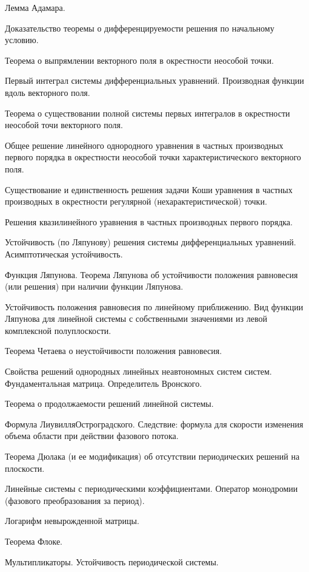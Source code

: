 \documentclass[a4paper]{article}
\begin{document}
\begin{nums}{-2}
Лемма Адамара.
\item
Доказательство теоремы о дифференцируемости решения по начальному
условию.
\item
Теорема о выпрямлении векторного поля в окрестности неособой
точки.
\item
Первый интеграл системы дифференциальных уравнений. Производная
функции вдоль векторного поля.
\item
Теорема о существовании полной системы первых интегралов в
окрестности неособой точи векторного поля.
\item
Общее решение линейного однородного уравнения в частных
производных первого порядка в окрестности неособой точки
характеристического векторного поля.
\item
Существование и единственность решения задачи Коши уравнения в
частных производных в окрестности регулярной
(нехарактеристической) точки.
\item
Решения квазилинейного уравнения в частных производных первого
порядка.
\item
Устойчивость (по Ляпунову) решения системы дифференциальных
уравнений. Асимптотическая устойчивость.
\item
Функция Ляпунова. Теорема Ляпунова об устойчивости положения
равновесия (или решения) при наличии функции Ляпунова.
\item
Устойчивость положения равновесия по линейному приближению. Вид
функции Ляпунова для линейной системы с собственными значениями из
левой комплексной полуплоскости.
\item
Теорема Четаева о неустойчивости положения равновесия.
\item
Свойства решений однородных линейных неавтономных систем систем.
Фундаментальная матрица. Определитель Вронского.
\item
Теорема о продолжаемости решений линейной системы.
\item
Формула Лиувилля\ч Остроградского. Следствие: формула для скорости
изменения объема области при действии фазового потока.
\item
Теорема Дюлака (и ее модификация) об отсутствии периодических
решений на плоскости.
\item
Линейные системы с периодическими коэффициентами. Оператор
монодромии (фазового преобразования за период).
\item
Логарифм невырожденной матрицы.
\item
Теорема Флоке.
\item
Мультипликаторы. Устойчивость периодической системы.

\end{nums}
\end{document}
